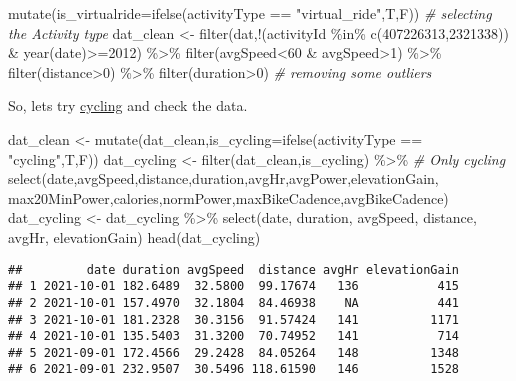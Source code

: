 \documentclass[
]{article}
\newenvironment{Shaded}{\begin{snugshade}}{\end{snugshade}}
\newcommand{\AttributeTok}[1]{\textcolor[rgb]{0.77,0.63,0.00}{#1}}
\newcommand{\CommentTok}[1]{\textcolor[rgb]{0.56,0.35,0.01}{\textit{#1}}}
\newcommand{\DecValTok}[1]{\textcolor[rgb]{0.00,0.00,0.81}{#1}}
\newcommand{\FunctionTok}[1]{\textcolor[rgb]{0.00,0.00,0.00}{#1}}
\newcommand{\NormalTok}[1]{#1}
\newcommand{\OtherTok}[1]{\textcolor[rgb]{0.56,0.35,0.01}{#1}}
\newcommand{\SpecialCharTok}[1]{\textcolor[rgb]{0.00,0.00,0.00}{#1}}
\newcommand{\StringTok}[1]{\textcolor[rgb]{0.31,0.60,0.02}{#1}}
\begin{document}
\begin{Shaded}
\begin{Highlighting}[]
  \FunctionTok{mutate}\NormalTok{(}\AttributeTok{is\_virtualride=}\FunctionTok{ifelse}\NormalTok{(activityType }\SpecialCharTok{==} \StringTok{"virtual\_ride"}\NormalTok{,T,F))}
         \CommentTok{\# selecting the Activity type }
\NormalTok{dat\_clean }\OtherTok{\textless{}{-}} \FunctionTok{filter}\NormalTok{(dat,}\SpecialCharTok{!}\NormalTok{(activityId }\SpecialCharTok{\%in\%} \FunctionTok{c}\NormalTok{(}\DecValTok{407226313}\NormalTok{,}\DecValTok{2321338}\NormalTok{)) }\SpecialCharTok{\&} \FunctionTok{year}\NormalTok{(date)}\SpecialCharTok{\textgreater{}=}\DecValTok{2012}\NormalTok{) }\SpecialCharTok{\%\textgreater{}\%} 
  \FunctionTok{filter}\NormalTok{(avgSpeed}\SpecialCharTok{\textless{}}\DecValTok{60} \SpecialCharTok{\&}\NormalTok{ avgSpeed}\SpecialCharTok{\textgreater{}}\DecValTok{1}\NormalTok{) }\SpecialCharTok{\%\textgreater{}\%} 
  \FunctionTok{filter}\NormalTok{(distance}\SpecialCharTok{\textgreater{}}\DecValTok{0}\NormalTok{) }\SpecialCharTok{\%\textgreater{}\%} 
  \FunctionTok{filter}\NormalTok{(duration}\SpecialCharTok{\textgreater{}}\DecValTok{0}\NormalTok{)  }\CommentTok{\# removing some outliers}
\end{Highlighting}
\end{Shaded}

So, lets try \underline{cycling} and check the data.

\begin{Shaded}
\begin{Highlighting}[]
\NormalTok{dat\_clean }\OtherTok{\textless{}{-}} \FunctionTok{mutate}\NormalTok{(dat\_clean,}\AttributeTok{is\_cycling=}\FunctionTok{ifelse}\NormalTok{(activityType }\SpecialCharTok{==} \StringTok{"cycling"}\NormalTok{,T,F))}
\NormalTok{dat\_cycling }\OtherTok{\textless{}{-}} \FunctionTok{filter}\NormalTok{(dat\_clean,is\_cycling) }\SpecialCharTok{\%\textgreater{}\%} \CommentTok{\# Only cycling }
  \FunctionTok{select}\NormalTok{(date,avgSpeed,distance,duration,avgHr,avgPower,elevationGain,}
\NormalTok{         max20MinPower,calories,normPower,maxBikeCadence,avgBikeCadence)}
\NormalTok{dat\_cycling }\OtherTok{\textless{}{-}}\NormalTok{ dat\_cycling }\SpecialCharTok{\%\textgreater{}\%}
  \FunctionTok{select}\NormalTok{(date, duration, avgSpeed, distance, avgHr, elevationGain)}
\FunctionTok{head}\NormalTok{(dat\_cycling)}
\end{Highlighting}
\end{Shaded}

\begin{verbatim}
##         date duration avgSpeed  distance avgHr elevationGain
## 1 2021-10-01 182.6489  32.5800  99.17674   136           415
## 2 2021-10-01 157.4970  32.1804  84.46938    NA           441
## 3 2021-10-01 181.2328  30.3156  91.57424   141          1171
## 4 2021-10-01 135.5403  31.3200  70.74952   141           714
## 5 2021-09-01 172.4566  29.2428  84.05264   148          1348
## 6 2021-09-01 232.9507  30.5496 118.61590   146          1528
\end{verbatim}
\end{document}
